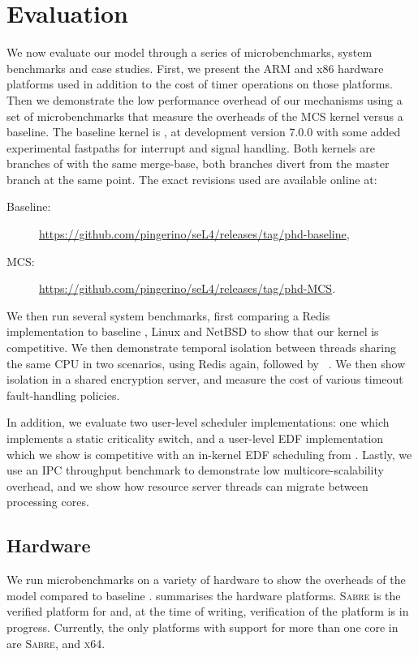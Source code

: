 \chapter{Evaluation}
\label{chap:evaluation}

We now evaluate our model through a series of microbenchmarks, system benchmarks and case studies.
First, we present the ARM and x86 hardware platforms used in addition to the cost of timer operations on those
platforms. Then we demonstrate the low performance overhead of our mechanisms using a set of 
microbenchmarks that measure the overheads of the MCS kernel versus a baseline. The baseline kernel
is \selfour, at development version 7.0.0 with some added experimental fastpaths for interrupt and signal
handling. Both kernels are branches of \selfour with the same merge-base, \ie both branches divert from the master branch at
the same point. The exact revisions used are available online at:
\begin{description}
    \item[Baseline:] \url{https://github.com/pingerino/seL4/releases/tag/phd-baseline},
    \item[MCS:] \url{https://github.com/pingerino/seL4/releases/tag/phd-MCS}.
\end{description}

We then run several system benchmarks, first comparing a Redis~\citep{redis:url} 
implementation to baseline \selfour, Linux and NetBSD to show that our kernel is competitive.
We then demonstrate temporal
isolation between threads sharing the same CPU in two scenarios,
using Redis again, followed by ~\citep{Wienand_Macpherson_04}. We then show isolation in a
shared encryption server, and measure the cost of various timeout fault-handling policies. 

In addition, we evaluate two user-level scheduler implementations: one which implements a static
criticality switch, and a user-level \gls{EDF} implementation which we show is
competitive with an in-kernel \gls{EDF} scheduling from \litmus. Lastly, we use an \gls{IPC}
throughput benchmark to demonstrate low multicore-scalability overhead, and we show 
how resource server threads can migrate between processing cores.

\section{Hardware}

We run microbenchmarks on a variety of hardware to show the overheads of the model compared to
baseline \selfour.  summarises the hardware platforms. \textsc{Sabre} is
the verified platform for \selfour and, at the time of writing, verification of the 
platform is in progress.
Currently, the only platforms with support for more than one core in \selfour are \textsc{Sabre},
and \textsc{x64}.

